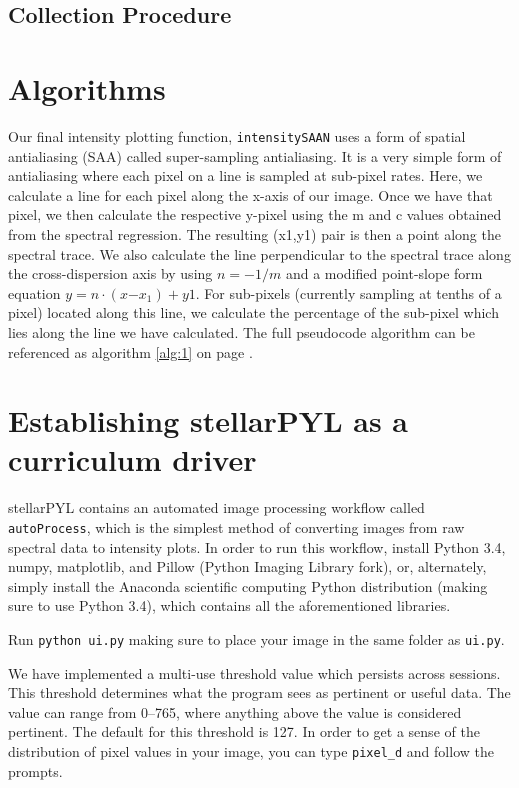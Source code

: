 \documentclass[prb,preprint]{revtex4-1}
\begin{document}
	\subsection{Collection Procedure}
\section{Algorithms}
	Our final intensity plotting function, \verb|intensitySAAN| uses a form of spatial antialiasing (SAA) called super-sampling antialiasing. It is a very simple form of antialiasing where each pixel on a line is sampled at sub-pixel rates. Here, we calculate a line for each pixel along the x-axis of our image. Once we have that pixel, we then calculate the respective y-pixel using the m and c values obtained from the spectral regression. The resulting (x1,y1) pair is then a point along the spectral trace. We also calculate the line perpendicular to the spectral trace along the cross-dispersion axis by using $n = -1/m$ and a modified point-slope form equation $y = n \cdot (x \mathbb{-} x_1) + y1$. For sub-pixels (currently sampling at tenths of a pixel) located along this line, we calculate the percentage of the sub-pixel which lies along the line we have calculated. The full pseudocode algorithm can be referenced as algorithm \ref{alg:1} on page \pageref{alg:1}.

\section{Establishing stellarPYL as a curriculum driver}
	stellarPYL contains an automated image processing workflow called \verb|autoProcess|, which is the simplest method of converting images from raw spectral data to intensity plots. In order to run this workflow, install Python 3.4, numpy, matplotlib, and Pillow (Python Imaging Library fork), or, alternately, simply install the Anaconda scientific computing Python distribution (making sure to use Python 3.4), which contains all the aforementioned libraries.

	Run \verb|python ui.py| making sure to place your image in the same folder as \verb|ui.py|.

	We have implemented a multi-use threshold value which persists across sessions. This threshold determines what the program sees as pertinent or useful data. The value can range from 0--765, where anything above the value is considered pertinent. The default for this threshold is 127. In order to get a sense of the distribution of pixel values in your image, you can type \verb|pixel_d| and follow the prompts.
\end{document}
